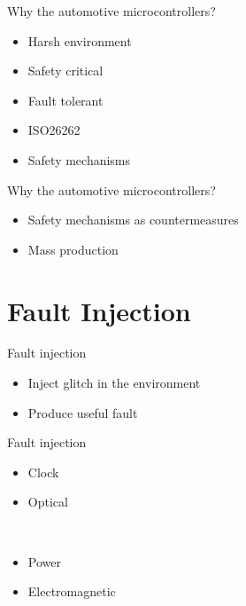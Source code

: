 \documentclass[table]{beamer}
\begin{document}
\begin{frame}{Why the automotive microcontrollers?}
    
    \begin{itemize}
        \item Harsh environment
        \item Safety critical
        \item Fault tolerant
        \item ISO26262
        \item Safety mechanisms
    \end{itemize}
\end{frame}

\begin{frame}{Why the automotive microcontrollers?}
    \begin{itemize}
        \item Safety mechanisms as countermeasures
        \item Mass production
    \end{itemize}
\end{frame}

\section{Fault Injection}

\begin{frame}
    \tableofcontents[currentsection]
\end{frame}

\begin{frame}{Fault injection}
    \begin{itemize}
        \item Inject glitch in the environment
        \item Produce useful fault
    \end{itemize}
\end{frame}

\begin{frame}{Fault injection}
    \begin{itemize}
        \item Clock 
        \item Optical 
    \end{itemize}
    \ \\
    \begin{itemize}
        \item Power
        \item Electromagnetic
    \end{itemize}
\end{frame}
\end{document}
